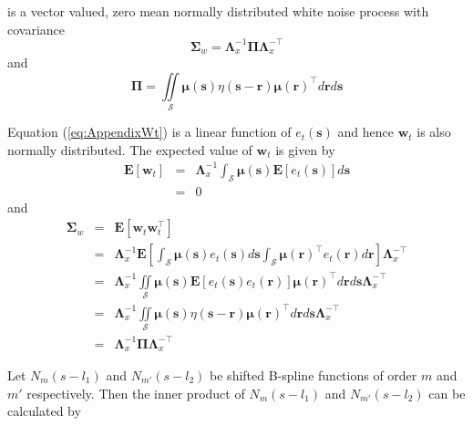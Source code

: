 \documentclass[journal,a4paper]{IEEEtran}
\begin{document}
{{\begin{lemma}
is a vector valued, zero mean normally distributed white noise process with covariance
\begin{equation}
\boldsymbol\Sigma_w =\mathbf{\Lambda}_{x}^{-1}\boldsymbol\Pi\mathbf{\Lambda}_{x}^{- \top}
\end{equation}
and
\begin{equation}
 \boldsymbol\Pi=\iint\limits_{\mathcal{S}}\boldsymbol\mu\left(\mathbf s\right)\eta\left(\mathbf s-\mathbf r\right)\boldsymbol\mu\left(\mathbf r\right)^\top d\mathbf{r}d\mathbf{s}
\end{equation}
\label{lemma:FieldCovariance}
\end{lemma}
\begin{IEEEproof}
 Equation (\ref{eq:AppendixWt}) is a linear function of $e_t(\mathbf s)$ and hence $\mathbf{w}_t$ is also normally distributed. The expected value of $\mathbf w_t$ is given by 
\begin{eqnarray}
 \mathbf E\left[ \mathbf w_t\right]&=& \mathbf{\Lambda}_{x}^{-1}\int_{\mathcal{S}}\boldsymbol\mu \left(\mathbf{s}\right)\mathbf E\left[e_t\left(\mathbf{s}\right)\right] d\mathbf{s} \nonumber \\
&=&0
\end{eqnarray}
and 
\begin{eqnarray}
\mathbf \Sigma_w&{}={}&\mathbf E[ \mathbf w_t \mathbf w_{t}^{\top}]\nonumber\\
&=& \mathbf{\Lambda}_{x}^{-1}\mathbf E[\int_{\mathcal{S}}\boldsymbol\mu\left(\mathbf s\right)e_t\left(\mathbf s\right)d\mathbf s\int_{\mathcal{S}}\boldsymbol\mu\left(\mathbf r\right)^{\top}e_t\left(\mathbf r\right)d\mathbf r]\mathbf{\Lambda}_{x}^{- \top} \nonumber \\
&=&\mathbf{\Lambda}_{x}^{-1}\iint\limits_{\mathcal{S}}\boldsymbol\mu\left(\mathbf s\right) \mathbf E[e_t\left(\mathbf s\right)e_t\left(\mathbf r\right)]\boldsymbol\mu\left(\mathbf r\right)^{\top}d\mathbf r d\mathbf s\mathbf{\Lambda}_{x}^{- \top} \nonumber\\
&=&{}\mathbf{\Lambda}_{x}^{-1}\iint\limits_{\mathcal{S}}\boldsymbol\mu\left(\mathbf s\right) \eta\left(\mathbf s- \mathbf r \right)\boldsymbol\mu\left(\mathbf r\right)^{\top}d\mathbf r d\mathbf s\mathbf{\Lambda}_{x}^{- \top} \nonumber\\
&=&\mathbf{\Lambda}_{x}^{-1}\boldsymbol\Pi\mathbf{\Lambda}_{x}^{- \top}
\end{eqnarray}
\setlength{\arraycolsep}{5pt}
\end{IEEEproof}
\begin{lemma}
Let $N_m\left(s-l_1\right)$ and $N_{m'}\left(s-l_2\right)$ be shifted B-spline functions of order $m$ and $m'$ respectively. Then the inner product of  $N_m\left(s-l_1\right)$  and $N_{m'}\left(s-l_2\right)$ can be calculated by 

\end{lemma}}}
\end{document}
